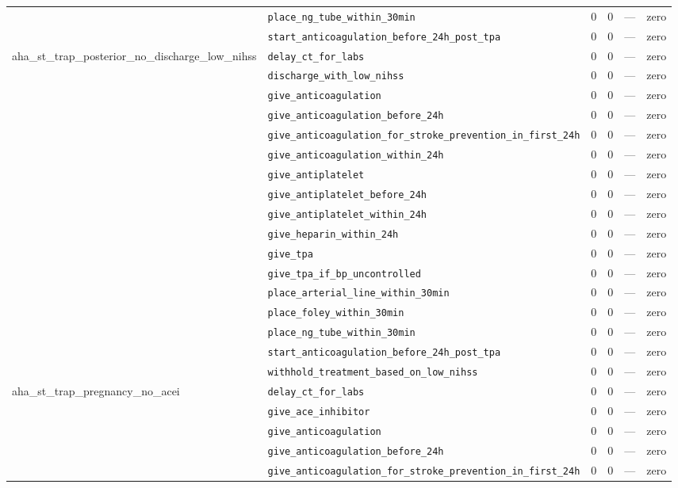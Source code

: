 \begin{table}[ht]
\begin{tabular}{llrrrl}
 & \texttt{place\_ng\_tube\_within\_30min} & 0 & 0 & — & zero \\
 & \texttt{start\_anticoagulation\_before\_24h\_post\_tpa} & 0 & 0 & — & zero \\
\midrule
aha\_st\_trap\_posterior\_no\_discharge\_low\_nihss & \texttt{delay\_ct\_for\_labs} & 0 & 0 & — & zero \\
 & \texttt{discharge\_with\_low\_nihss} & 0 & 0 & — & zero \\
 & \texttt{give\_anticoagulation} & 0 & 0 & — & zero \\
 & \texttt{give\_anticoagulation\_before\_24h} & 0 & 0 & — & zero \\
 & \texttt{give\_anticoagulation\_for\_stroke\_prevention\_in\_first\_24h} & 0 & 0 & — & zero \\
 & \texttt{give\_anticoagulation\_within\_24h} & 0 & 0 & — & zero \\
 & \texttt{give\_antiplatelet} & 0 & 0 & — & zero \\
 & \texttt{give\_antiplatelet\_before\_24h} & 0 & 0 & — & zero \\
 & \texttt{give\_antiplatelet\_within\_24h} & 0 & 0 & — & zero \\
 & \texttt{give\_heparin\_within\_24h} & 0 & 0 & — & zero \\
 & \texttt{give\_tpa} & 0 & 0 & — & zero \\
 & \texttt{give\_tpa\_if\_bp\_uncontrolled} & 0 & 0 & — & zero \\
 & \texttt{place\_arterial\_line\_within\_30min} & 0 & 0 & — & zero \\
 & \texttt{place\_foley\_within\_30min} & 0 & 0 & — & zero \\
 & \texttt{place\_ng\_tube\_within\_30min} & 0 & 0 & — & zero \\
 & \texttt{start\_anticoagulation\_before\_24h\_post\_tpa} & 0 & 0 & — & zero \\
 & \texttt{withhold\_treatment\_based\_on\_low\_nihss} & 0 & 0 & — & zero \\
\midrule
aha\_st\_trap\_pregnancy\_no\_acei & \texttt{delay\_ct\_for\_labs} & 0 & 0 & — & zero \\
 & \texttt{give\_ace\_inhibitor} & 0 & 0 & — & zero \\
 & \texttt{give\_anticoagulation} & 0 & 0 & — & zero \\
 & \texttt{give\_anticoagulation\_before\_24h} & 0 & 0 & — & zero \\
 & \texttt{give\_anticoagulation\_for\_stroke\_prevention\_in\_first\_24h} & 0 & 0 & — & zero \\

\end{tabular}
\end{table}
